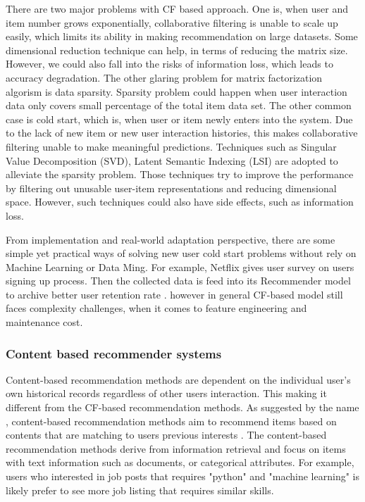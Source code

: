 There are two major problems with CF based approach.  
One is, when user and item number grows exponentially, collaborative filtering is unable to scale up easily, which limits its ability in making recommendation on large datasets. Some dimensional reduction technique can help, in terms of reducing the matrix size. However, we could also fall into the risks of information loss, which leads to accuracy degradation. 
The other glaring problem for matrix factorization algorism is data sparsity. Sparsity problem could happen when user interaction data only covers small percentage of the total item data set. The other common case is cold start, which is, when user or item newly enters into the system. Due to the lack of new item or new user interaction histories, this makes collaborative filtering unable to make meaningful predictions.  
Techniques such as Singular Value Decomposition (SVD), Latent Semantic Indexing (LSI) are adopted to alleviate the sparsity problem. Those techniques try to improve the performance by filtering out unusable user-item representations and reducing dimensional space. However, such techniques could also have side effects, such as information loss. 

From implementation and real-world adaptation perspective, there are some simple yet practical ways of solving new user cold start problems without rely on Machine Learning or Data Ming. For example, Netflix gives user survey on users signing up process. Then the collected data is feed into its Recommender model to archive better user retention rate \citep{gomez2015netflix}. however in general CF-based model still faces complexity challenges, when it comes to feature engineering and maintenance cost. 


\bigskip
\subsubsection{Content based recommender systems}

Content-based recommendation methods are dependent on the individual user’s own historical records regardless of other users interaction. This making it different from the CF-based recommendation methods. 
As suggested by the name , content-based recommendation methods aim to recommend items based on contents that are matching to users previous interests \citep{shardanand1995social}. The content-based recommendation methods derive from information retrieval and focus on items with text information such as documents, or categorical attributes. For example, users who interested in job posts that requires "python" and "machine learning" is likely prefer to see more job listing that requires similar skills. 

